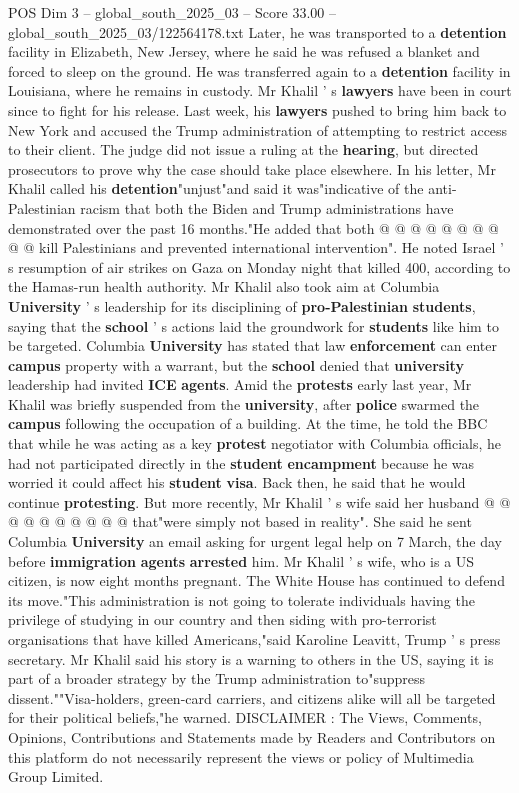 \begin{textsample}{POS Dim 3 – global\_south\_2025\_03 – Score 33.00 – global\_south\_2025\_03/122564178.txt}
Later, he was transported to a \textbf{detention} facility in Elizabeth, New Jersey, where he said he was refused a blanket and forced to sleep on the ground.
He was transferred again to a \textbf{detention} facility in Louisiana, where he remains in custody.
Mr Khalil ' s \textbf{lawyers} have been in court since to fight for his release.
Last week, his \textbf{lawyers} pushed to bring him back to New York and accused the Trump administration of attempting to restrict access to their client.
The judge did not issue a ruling at the \textbf{hearing}, but directed prosecutors to prove why the case should take place elsewhere.
In his letter, Mr Khalil called his \textbf{detention}"unjust"and said it was"indicative of the anti-Palestinian racism that both the Biden and Trump administrations have demonstrated over the past 16 months."He added that both @ @ @ @ @ @ @ @ @ @ kill Palestinians and prevented international intervention".
He noted Israel ' s resumption of air strikes on Gaza on Monday night that killed 400, according to the Hamas-run health authority.
Mr Khalil also took aim at Columbia \textbf{University} ' s leadership for its disciplining of \textbf{pro-Palestinian} \textbf{students}, saying that the \textbf{school} ' s actions laid the groundwork for \textbf{students} like him to be targeted.
Columbia \textbf{University} has stated that law \textbf{enforcement} can enter \textbf{campus} property with a warrant, but the \textbf{school} denied that \textbf{university} leadership had invited \textbf{ICE} \textbf{agents}.
Amid the \textbf{protests} early last year, Mr Khalil was briefly suspended from the \textbf{university}, after \textbf{police} swarmed the \textbf{campus} following the occupation of a building.
At the time, he told the BBC that while he was acting as a key \textbf{protest} negotiator with Columbia officials, he had not participated directly in the \textbf{student} \textbf{encampment} because he was worried it could affect his \textbf{student} \textbf{visa}.
Back then, he said that he would continue \textbf{protesting}.
But more recently, Mr Khalil ' s wife said her husband @ @ @ @ @ @ @ @ @ @ that"were simply not based in reality".
She said he sent Columbia \textbf{University} an email asking for urgent legal help on 7 March, the day before \textbf{immigration} \textbf{agents} \textbf{arrested} him.
Mr Khalil ' s wife, who is a US citizen, is now eight months pregnant.
The White House has continued to defend its move."This administration is not going to tolerate individuals having the privilege of studying in our country and then siding with pro-terrorist organisations that have killed Americans,"said Karoline Leavitt, Trump ' s press secretary.
Mr Khalil said his story is a warning to others in the US, saying it is part of a broader strategy by the Trump administration to"suppress dissent.""Visa-holders, green-card carriers, and citizens alike will all be targeted for their political beliefs,"he warned.
DISCLAIMER : The Views, Comments, Opinions, Contributions and Statements made by Readers and Contributors on this platform do not necessarily represent the views or policy of Multimedia Group Limited.


\end{textsample}
